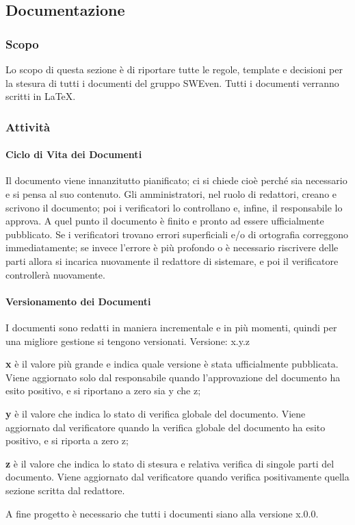 \subsection{Documentazione}
\subsubsection{Scopo}
Lo scopo di questa sezione è di riportare tutte le regole, template e decisioni 
per la stesura di tutti i documenti del gruppo SWEven. \newline
Tutti i documenti verranno scritti in \LaTeX.

\subsubsection{Attività}
\paragraph{Ciclo di Vita dei Documenti}
Il documento viene innanzitutto pianificato; ci si chiede cioè perché sia necessario e si pensa al suo contenuto. 
Gli amministratori, nel ruolo di redattori, creano e scrivono il documento; poi i verificatori lo controllano 
e, infine, il responsabile lo approva. A quel punto il documento è finito e pronto ad essere ufficialmente 
pubblicato. \newline
Se i verificatori trovano errori superficiali e/o di ortografia correggono immediatamente;
se invece l'errore è più profondo o è necessario riscrivere delle parti allora si
incarica nuovamente il redattore di sistemare, e poi il verificatore controllerà nuovamente.

\paragraph{Versionamento dei Documenti}
I documenti sono redatti in maniera incrementale e in più momenti, quindi per una migliore 
gestione si tengono versionati.
\newline Versione: x.y.z
\begin{description}
    \item \textbf{x} è il valore più grande e indica quale versione è stata ufficialmente pubblicata.
            Viene aggiornato solo dal responsabile quando l'approvazione del documento ha esito positivo,
            e si riportano a zero sia y che z;
    \item \textbf{y} è il valore che indica lo stato di verifica globale del documento. Viene aggiornato dal verificatore quando la verifica globale del documento ha esito positivo, e si riporta a zero z;
    \item \textbf{z} è il valore che indica lo stato di stesura e relativa verifica di singole parti del documento. 
            Viene aggiornato dal verificatore quando verifica positivamente quella sezione scritta dal redattore.
\end{description}
A fine progetto è necessario che tutti i documenti siano alla versione x.0.0.

